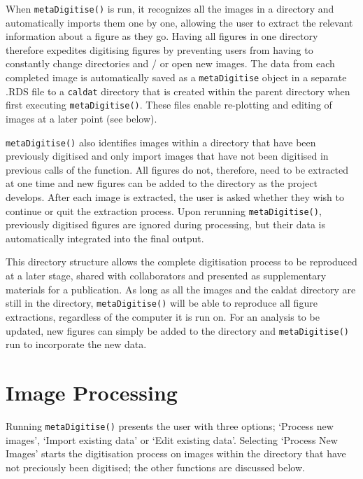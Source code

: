 \documentclass[12pt]{article}
\newcommand{\code}[1]{\texttt{#1}}
\newcommand{\fct}[1]{\texttt{#1()}}
\begin{document}
When \fct{metaDigitise} is run, it recognizes all the images in a directory and automatically imports them one by one, allowing the user to extract the relevant information about a figure as they go. Having all figures in one directory therefore expedites digitising figures by preventing users from having to constantly change directories and / or open new images. The data from each completed image is automatically saved as a \code{metaDigitise} object in a separate .RDS file to a \code{caldat} directory that is created within the parent directory when first executing \fct{metaDigitise}. These files enable re-plotting and editing of images at a later point (see below).

\fct{metaDigitise} also identifies images within a directory that have been previously digitised and only import images that have not been digitised in previous calls of the function. All figures do not, therefore, need to be extracted at one time and new figures can be added to the directory as the project develops. After each image is extracted, the user is asked whether they wish to continue or quit the extraction process. Upon rerunning \fct{metaDigitise}, previously digitised figures are ignored during processing, but their data is automatically integrated into the final output. 

This directory structure allows the complete digitisation process to be reproduced at a later stage, shared with collaborators and presented as supplementary materials for a publication. As long as all the images and the caldat directory are still in the directory, \fct{metaDigitise} will be able to reproduce all figure extractions, regardless of the computer it is run on. For an analysis to be updated, new figures can simply be added to the directory and \fct{metaDigitise} run to incorporate the new data. 



\section{Image Processing}
Running \fct{metaDigitise} presents the user with three options; `Process new images', `Import existing data' or `Edit existing data'. Selecting `Process New Images' starts the digitisation process on images within the directory that have not preciously been digitised; the other functions are discussed below.
\end{document}
